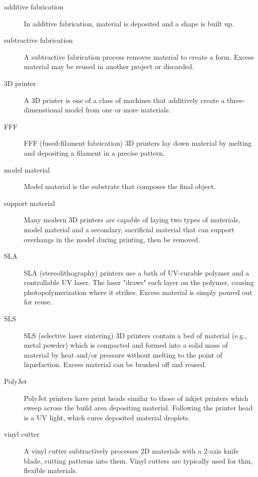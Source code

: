 \begin{description}

\item[additive fabrication] In additive fabrication, material is deposited and a shape is built up.

\item[subtractive fabrication] A subtractive fabrication process removes material to create a form. Excess material may be reused in another project or discarded.

\item[3D printer] A 3D printer is one of a class of machines that additively create a three-dimenstional model from one or more materials.

\item[FFF] FFF (fused-filament fabrication) 3D printers lay down material by melting and depositing a filament in a precise pattern.

\item[model material] Model material is the substrate that composes the final object.

\item[support material] Many modern 3D printers are capable of laying two types of materials, model material and a secondary, sacrificial material that can support overhangs in the model during printing, then be removed.

\item[SLA] SLA (stereolithography) printers use a bath of UV-curable polymer and a controllable UV laser. The laser "draws" each layer on the polymer, causing photopolymerization where it strikes. Excess material is simply poured out for reuse.

\item[SLS] SLS (selective laser sintering) 3D printers contain a bed of material (e.g., metal powder) which is compacted and formed into a solid mass of material by heat and/or pressure without melting to the point of liquefaction. Excess material can be brushed off and reused.

\item[PolyJet] PolyJet printers have print heads similar to those of inkjet printers which sweep across the build area depositing material. Following the printer head is a UV light, which cures deposited material droplets.

\item[vinyl cutter] A vinyl cutter subtractively processes 2D materials with a 2-axis knife blade, cutting patterns into them. Vinyl cutters are typically used for thin, flexible materials.


\end{description}
